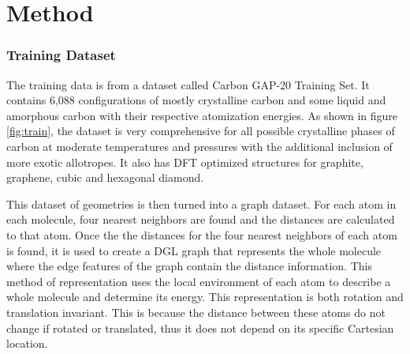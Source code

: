 \documentclass[12pt]{scrartcl}
\begin{document}
\newpage 

\section{Method}
\subsubsection{Training Dataset}\label{Train}
The training data is from a dataset called Carbon GAP-20 Training Set\cite{gap20}. It contains 6,088 configurations of mostly crystalline carbon and some liquid and amorphous carbon with their respective atomization energies. As shown in figure \ref{fig:train}, the dataset is very comprehensive for all possible crystalline phases of carbon at moderate temperatures and pressures with the additional inclusion of more exotic allotropes. It also has DFT optimized structures for graphite, graphene, cubic and hexagonal diamond. 

This dataset of geometries is then turned into a graph dataset. For each atom in each molecule, four nearest neighbors are found and the distances are calculated to that atom. Once the the distances for the four nearest neighbors of each atom is found, it is used to create a DGL\cite{dgl} graph that represents the whole molecule where the edge features of the graph contain the distance information. This method of representation uses the local environment of each atom to describe a whole molecule and determine its energy. This representation is both rotation and translation invariant. This is because the distance between these atoms do not change if rotated or translated, thus it does not depend on its specific Cartesian location.
\end{document}
